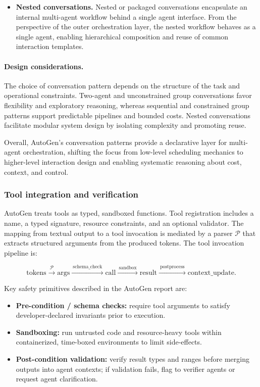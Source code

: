 \begin{itemize}
  \item \textbf{Nested conversations.} Nested or packaged conversations encapsulate an internal multi-agent workflow behind a single agent interface. From the perspective of the outer orchestration layer, the nested workflow behaves as a single agent, enabling hierarchical composition and reuse of common interaction templates.

\end{itemize}


\paragraph{Design considerations.}
The choice of conversation pattern depends on the structure of the task and operational constraints. Two-agent and unconstrained group conversations favor flexibility and exploratory reasoning, whereas sequential and constrained group patterns support predictable pipelines and bounded costs. Nested conversations facilitate modular system design by isolating complexity and promoting reuse.

Overall, AutoGen’s conversation patterns provide a declarative layer for multi-agent orchestration, shifting the focus from low-level scheduling mechanics to higher-level interaction design and enabling systematic reasoning about cost, context, and control.

\subsubsection{Tool integration and verification}
\label{sec:autogen_tools}

AutoGen treats tools as typed, sandboxed functions. Tool registration includes a name, a typed signature, resource constraints, and an optional validator. The mapping from textual output to a tool invocation is mediated by a parser \( \mathcal{P}\) that extracts structured arguments from the produced tokens. The tool invocation pipeline is:

\[
\text{tokens} \xrightarrow{\ \mathcal{P}\ } \text{args} \xrightarrow{\ \text{schema\_check}\ } \text{call}\xrightarrow{\ \text{sandbox}\ } \text{result} \xrightarrow{\ \text{postprocess}\ } \text{context\_update}.
\]

Key safety primitives described in the AutoGen report are:

\begin{itemize}
  \item \textbf{Pre-condition / schema checks:} require tool arguments to satisfy developer-declared invariants prior to execution.
  \item \textbf{Sandboxing:} run untrusted code and resource-heavy tools within containerized, time-boxed environments to limit side-effects.
  \item \textbf{Post-condition validation:} verify result types and ranges before merging outputs into agent contexts; if validation fails, flag to verifier agents or request agent clarification.
\end{itemize}

